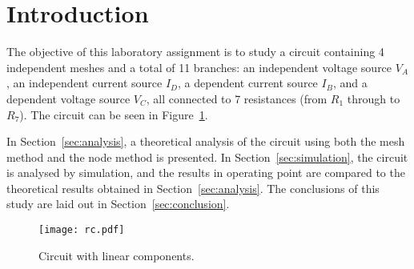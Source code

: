 \section{Introduction}
\label{sec:introduction}

The objective of this laboratory assignment is to study a circuit containing 4 independent meshes and a total of 11 branches: an independent voltage source $V_A$, an independent current source $I_D$, a dependent current source $I_B$, and a dependent voltage source $V_C$, all connected to 7 resistances (from $R_1$ through to $R_7$). The circuit can be seen in Figure~\ref{fig:rc}.

In Section~\ref{sec:analysis}, a theoretical analysis of the circuit using both the mesh method and the node method is
presented. In Section~\ref{sec:simulation}, the circuit is analysed by
simulation, and the results in operating point are compared to the theoretical results obtained in
Section~\ref{sec:analysis}. The conclusions of this study are laid out in
Section~\ref{sec:conclusion}.

\begin{figure}[h] \centering
\texttt{[image: rc.pdf]}
\caption{Circuit with linear components.}
\label{fig:rc}
\end{figure}

